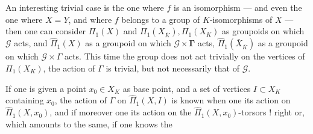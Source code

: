 An interesting trivial case is the one where $f$ is an isomorphism --- and even the one where $X=Y$, and where $f$ belongs to a group  of $K$-isomorphisms of $X$ --- then one can consider $\Pi_1(X)$ and $\Pi_1(X_{\bar K}),\Pi_1(X_K)$ as groupoids on which $\mathcal G$ acts, and $\widehat\Pi_1(X)$ as a groupoid on which $\mathcal G\times\mathbf{\Gamma}$ acts, $\widehat\Pi_1(\bar X_{\bar K})$ as a groupoid on which $\mathcal G\times\Gamma$ acts. This time the group does not act trivially on the vertices of $\Pi_1(X_K)$, the action of $\Gamma$ is trivial, but not necessarily that of $\mathcal G$.

If one is given a point $x_0\in X_K$ as base point, and a set of vertices $I\subset X_K$ containing $x_0$, the action of $\Gamma$ on $\widehat\Pi_1(X,I)$ is known when one  its action on $\widehat\Pi_1(X,x_0)$, and if moreover one  its action on the $\widehat\Pi_1(X,x_0)$-torsors ! right
or, which amounts to the same, if one knows the
